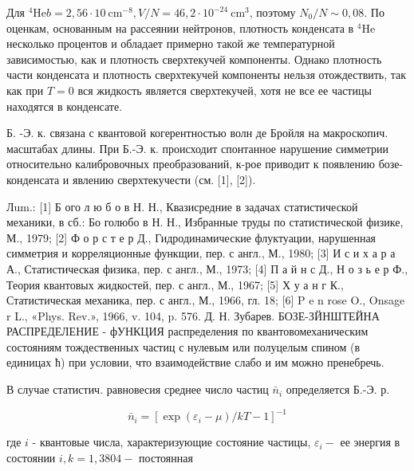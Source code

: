 \documentclass[10pt]{article}
\begin{document}
Для ${ }^{4} \mathrm{He} b=2,56 \cdot 10 \mathrm{~cm}^{-8}, V / N=46,2 \cdot 10^{-24} \mathrm{~cm}^{3}$, поэтому $N_{0} / N \sim 0,08$. По оценкам, основанным на рассеянии нейтронов, плотность конденсата в ${ }^{4} \mathrm{He}$ несколько процентов и обладает примерно такой же температурной зависимостью, как и плотность сверхтекучей компоненты. Однако плотность части конденсата и плотность сверхтекучей компоненты нельзя отождествить, так как при $T=0$ вся жидкость является сверхтекучей, хотя не все ее частицы находятся в конденсате.



Б. -Э. к. связана с квантовой когерентностью волн де Бройля на макроскопич. масштабах длины. При Б.-Э. к. происходит спонтанное нарушение симметрии относительно калибровочных преобразований, к-рое приводит к появлению бозе-конденсата и явлению сверхтекучести (см. [1], [2]).



Лum.: [1] Б ого л ю б о в Н. Н., Квазисредние в задачах статистической механики, в сб.: Бо голюбо в Н. Н., Избранные труды по статистической физике, М., 1979; [2] Ф о р с т е р Д., Гидродинамические флуктуации, нарушенная симметрия и корреляционные функщии, пер. с англ., М., 1980; [3] И с и х а р а А., Статистическая физика, пер. с англ., М., 1973; [4] П а й н с Д., Н о з ь е р Ф., Теория квантовых жидкостей, пер. с англ., М., 1967; [5] Х у а н г К., Статистическая механика, пер. с англ., М., 1966, гл. 18; [6] P e n rose O., Onsage r L., «Phys. Rev.», 1966, v. 104, p. 576. Д. Н. Зубарев. БОЗЕ-ЗЙНШТЕЙНА РАСПРЕДЕЛЕНИЕ - фУНКЦИЯ распределения по квантовомеханическим состояниям тождественных частиц с нулевым или полуцелым спином (в единицах ћ) при условии, что взаимодействие слабо и им можно пренебречь.



В случае статистич. равновесия среднее число частиц $\bar{n}_{i}$ определяется Б.-Э. р.



\[

\bar{n}_{i}=\left[\exp \left(\varepsilon_{i}-\mu\right) / k T-1\right]^{-1}

\]



где $i$ - квантовые числа, характеризующие состояние частицы, $\varepsilon_{i}-$ ее энергия в состоянии $i, k=1,3804-$ постоянная
\end{document}
